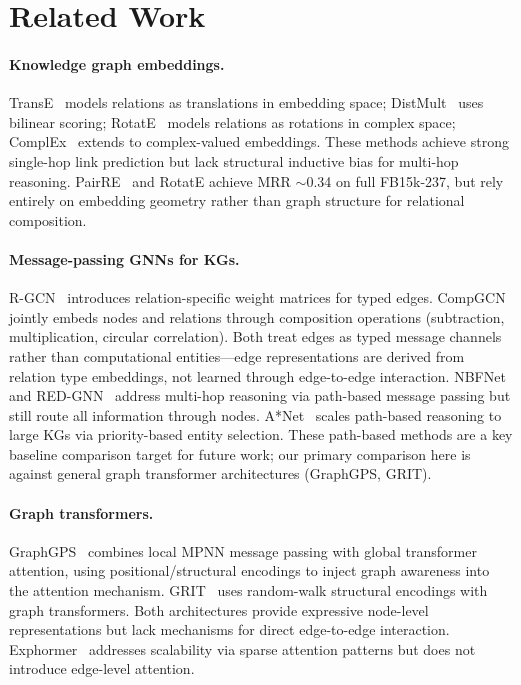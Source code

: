 \documentclass{article}
\begin{document}
\section{Related Work}
\label{sec:related}

\paragraph{Knowledge graph embeddings.}
TransE~\cite{bordes2013translating} models relations as translations in embedding space; DistMult~\cite{yang2015embedding} uses bilinear scoring; RotatE~\cite{sun2019rotate} models relations as rotations in complex space; ComplEx~\cite{trouillon2016complex} extends to complex-valued embeddings. These methods achieve strong single-hop link prediction but lack structural inductive bias for multi-hop reasoning. PairRE~\cite{chao2021pairre} and RotatE achieve MRR $\sim$0.34 on full FB15k-237, but rely entirely on embedding geometry rather than graph structure for relational composition.

\paragraph{Message-passing GNNs for KGs.}
R-GCN~\cite{schlichtkrull2018modeling} introduces relation-specific weight matrices for typed edges. CompGCN~\cite{vashishth2019composition} jointly embeds nodes and relations through composition operations (subtraction, multiplication, circular correlation). Both treat edges as typed message channels rather than computational entities---edge representations are derived from relation type embeddings, not learned through edge-to-edge interaction. NBFNet~\cite{zhu2021neural} and RED-GNN~\cite{zhang2022knowledge} address multi-hop reasoning via path-based message passing but still route all information through nodes. A*Net~\cite{zhu2022astar} scales path-based reasoning to large KGs via priority-based entity selection. These path-based methods are a key baseline comparison target for future work; our primary comparison here is against general graph transformer architectures (GraphGPS, GRIT).

\paragraph{Graph transformers.}
GraphGPS~\cite{rampavsek2022recipe} combines local MPNN message passing with global transformer attention, using positional/structural encodings to inject graph awareness into the attention mechanism. GRIT~\cite{ma2023graph} uses random-walk structural encodings with graph transformers. Both architectures provide expressive node-level representations but lack mechanisms for direct edge-to-edge interaction. Exphormer~\cite{shirzad2023exphormer} addresses scalability via sparse attention patterns but does not introduce edge-level attention.
\end{document}

